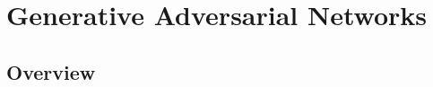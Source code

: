 \documentclass[12pt,a4paper,openany]{book}
\begin{document}
\section{Generative Adversarial Networks}


\subsection{Overview}
\end{document}
